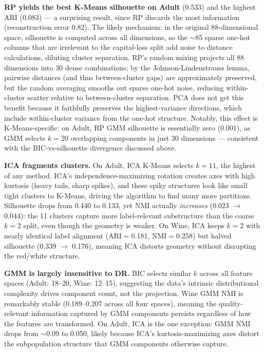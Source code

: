 \documentclass[conference]{IEEEtran}
\begin{document}
\textbf{RP yields the best K-Means silhouette on Adult} (0.533)
and the highest ARI (0.083) --- a surprising result, since RP
discards the most information (reconstruction error 0.82). The likely
mechanism: in the original 88-dimensional space, silhouette is
computed across all dimensions, so the $\sim$85 sparse one-hot
columns that are irrelevant to the capital-loss split add noise to
distance calculations, diluting cluster separation. RP's random
mixing projects all 88 dimensions into 30 dense combinations; by the
Johnson-Lindenstrauss lemma, pairwise distances (and thus
between-cluster gaps) are approximately preserved, but the random
averaging smooths out sparse one-hot noise, reducing within-cluster
scatter relative to between-cluster separation. PCA does not get this
benefit because it faithfully preserves the highest-variance
directions, which include within-cluster variance from the one-hot
structure. Notably, this effect is K-Means-specific: on Adult, RP GMM
silhouette is essentially zero (0.001), as GMM selects $k{=}20$
overlapping components in just 30 dimensions --- consistent with the
BIC-vs-silhouette divergence discussed above.

\textbf{ICA fragments clusters.} On Adult, ICA K-Means selects
$k{=}11$, the highest of any method. ICA's independence-maximizing
rotation creates axes with high kurtosis (heavy tails, sharp spikes),
and these spiky structures look like small tight clusters to K-Means,
driving the algorithm to find many more partitions. Silhouette drops
from 0.440 to 0.133, yet NMI actually \emph{increases} (0.023
$\to$ 0.044): the 11 clusters capture more label-relevant
substructure than the coarse $k{=}2$ split, even though the
geometry is weaker. On Wine, ICA keeps $k{=}2$ with nearly identical label alignment
(ARI$=$0.181, NMI$=$0.258) but halved silhouette (0.339 $\to$ 0.176),
meaning ICA distorts geometry without disrupting the red/white
structure.

\textbf{GMM is largely insensitive to DR.} BIC selects similar $k$
across all feature spaces (Adult: 18--20, Wine: 12--15), suggesting
the data's intrinsic distributional complexity drives component count,
not the projection. Wine GMM NMI is remarkably stable (0.189--0.207
across all four spaces), meaning the quality-relevant information
captured by GMM components persists regardless of how the features
are transformed. On Adult, ICA is the one exception: GMM NMI drops
from $\sim$0.09 to 0.050, likely because ICA's kurtosis-maximizing
axes distort the subpopulation structure that GMM components
otherwise capture.
\end{document}
